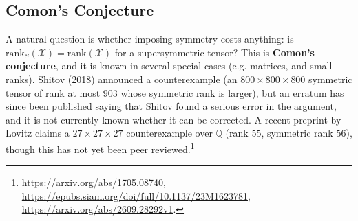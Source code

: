 \subsection{Comon's Conjecture}

    A natural question is whether imposing symmetry costs anything: is $\mathrm{rank}_S(\mathcal{X}) = \mathrm{rank}(\mathcal{X})$ for a supersymmetric tensor? This is \textbf{Comon's conjecture}, and it is known in several special cases (e.g. matrices, and small ranks). Shitov (2018) announced a counterexample (an $800 \times 800 \times 800$ symmetric tensor of rank at most $903$ whose symmetric rank is larger), but an erratum has since been published saying that Shitov found a serious error in the argument, and it is not currently known whether it can be corrected. A recent preprint by Lovitz claims a $27 \times 27 \times 27$ counterexample over $\mathbb{Q}$ (rank $55$, symmetric rank $56$), though this has not yet been peer reviewed.\footnote{\url{https://arxiv.org/abs/1705.08740}, \url{https://epubs.siam.org/doi/full/10.1137/23M1623781}, \url{https://arxiv.org/abs/2609.28292v1}.}

